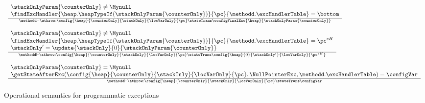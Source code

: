  \begin{figure}[ht!] 
\begin{frameit}
 $$ \begin{array}{l}
 \frac{ 
	             \begin{array}{l}	 
		           \stackOnlyParam{\counterOnly} \neq \Mynull   \\
			   \findExcHandler{\heap.\heapTypeOf(  \stackOnlyParam{\counterOnly} )  }{\pc}{\methodd.\excHandlerTable} = \bottom 
		     \end{array}	     
	      }
              {\methodd \vdash \athrow :  \config{\heap}{\counterOnly}{\stackOnly}{\locVarOnly}{\pc} 
		                         \stateTrans  
					\configFinalExc{\heap }{\stackOnlyParam{\counterOnly} }}%
\\ \\ 
\frac{ \begin{array}{l}	       %
		                \stackOnlyParam{\counterOnly} \neq \Mynull   \\
				\findExcHandler{\heap.\heapTypeOf(  \stackOnlyParam{\counterOnly} )  }{\pc}{\methodd.\excHandlerTable} = \pc^{eH} \\
				\stackOnly' = \update{\stackOnly}{0}{ \stackOnlyParam{\counterOnly} } \\
			    \end{array}	     
	      }
              {\methodd \vdash \athrow :  \config{\heap}{\counterOnly}{\stackOnly}{\locVarOnly}{\pc} 
		                          \stateTrans  
					   \config{\heap}{0}{\stackOnly'}{\locVarOnly}{\pc^{eH}}  } %
 \\ \\  
 \frac{ \begin{array}{l}     
	                     \stackOnlyParam{\counterOnly}  = \Mynull   \\
			     \getStateAfterExc( \config{\heap}{\counterOnly}{\stackOnly}{\locVarOnly}{\pc}, \NullPointerExc  ,\methodd.\excHandlerTable ) =  \configVar
      		    \end{array}	     
	      }
              {\methodd \vdash \athrow :  \config{\heap}{\counterOnly}{\stackOnly}{\locVarOnly}{\pc} 
		                         \stateTrans  
					  \configVar} %
	   
\end{array}$$
\caption{\sc Operational semantics for programmatic exceptions }
\label{opSem:obj:throw}
\end{frameit}
\end{figure}

